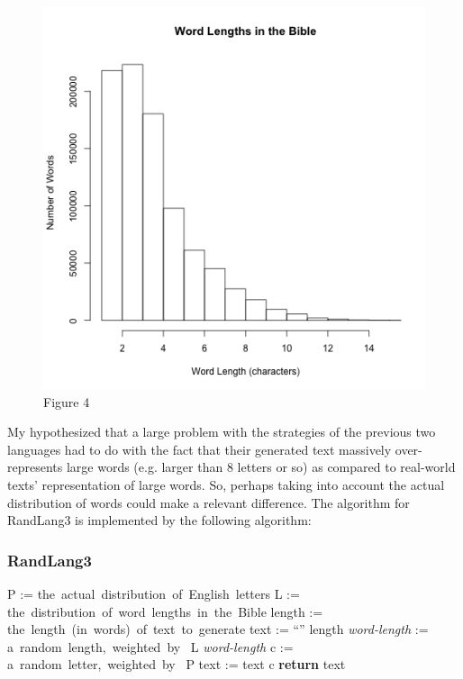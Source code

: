 \documentclass{article}
\begin{document}
\begin{figure}[h]
\centering
\includegraphics[width=13cm,keepaspectratio]{word-lengths-bible.png}
\captionsetup{labelformat=empty} \caption{Figure 4}
\end{figure}


My hypothesized that a large problem with the strategies of the previous two languages had to do with the fact that their generated text massively over-represents large words (e.g. larger than 8 letters or so) as compared to real-world texts' representation of large words. So, perhaps taking into account the actual distribution of words could make a relevant difference. The algorithm for RandLang3 is implemented by the following algorithm:


\vspace{0.4cm}
\subsubsection*{RandLang3}
\begin{adjustwidth}{1cm}{}\begin{programbox}
P := \mbox{the actual distribution of English letters}
L := \mbox{the distribution of word lengths in the Bible}
length := \mbox{the length (in words) of text to generate}
text := ``''
 \TO length \DO
  \textit{word-length} := \mbox{a random length, weighted by } L
   \TO \textit{word-length} \DO
    c := \mbox{a random letter, weighted by } P
    text := text \concat c
  \OD
\OD
\textbf{return } text
\end{programbox}\end{adjustwidth}
 \vspace{0.6cm}
\end{document}
